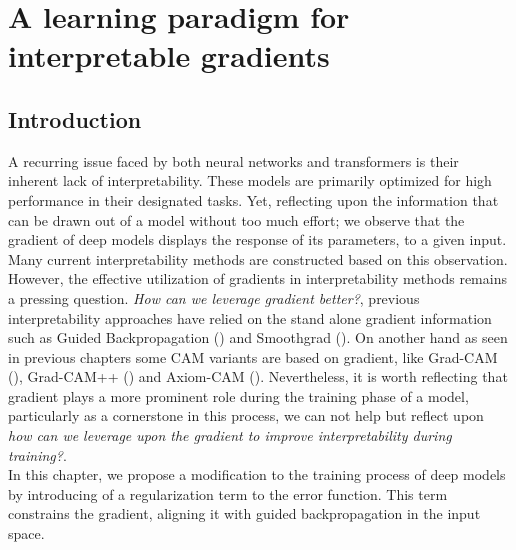 \chapter{A learning paradigm for interpretable gradients}
\chaptertoc{}
\label{ch:grad}
\section{Introduction}
\label{sec:grad_intro}
\noindent A recurring issue faced by both neural networks and transformers is their inherent
lack of interpretability. These models are primarily optimized for high performance in their 
designated tasks. Yet, reflecting upon the information that can be drawn out of a 
model without too much  effort; we observe that the gradient of deep models displays the response 
of its parameters, to a given input. Many current interpretability methods are constructed based 
on this observation.\\

\noindent However,  the effective utilization of gradients in interpretability methods remains a 
pressing question. \textit{How can we leverage gradient better?}, previous interpretability 
approaches have relied on the stand alone gradient information such as Guided Backpropagation 
(\cite{guidedbackprop}) and Smoothgrad (\cite{smilkov2017smoothgrad}). On  another hand as 
seen in previous chapters some CAM variants are based on gradient, like Grad-CAM 
(\cite{selvaraju2017grad}), Grad-CAM++ (\cite{chattopadhay2018grad}) and Axiom-CAM (\cite{axiombased}).
Nevertheless, it is worth reflecting that gradient plays a more prominent role during 
the training phase of a model, particularly as a cornerstone in this process, we can not help but
reflect upon \textit{how can we leverage upon the gradient to improve interpretability during 
training?}.\\

\noindent In this chapter, we propose a modification to the training process of deep models by 
introducing of a regularization term to the error function. This term constrains
the gradient, aligning it with guided backpropagation in the input space.








\newpage

